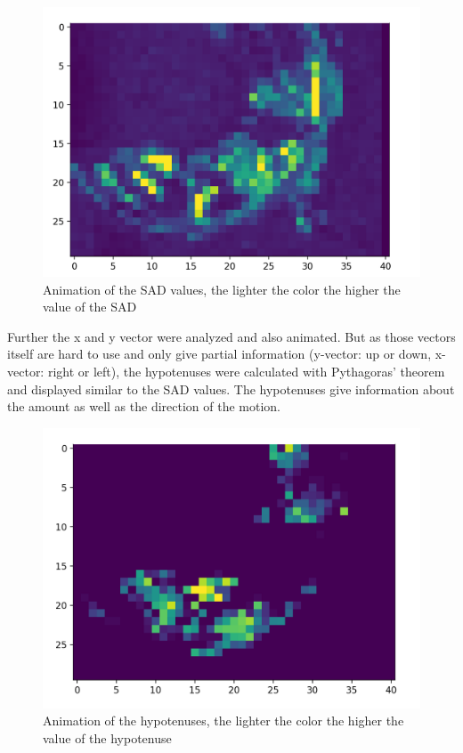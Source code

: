 \documentclass[12pt, a4paper]{report}
\begin{document}
    \noindent
    \begin{figure}[H]
    \centering
    \includegraphics[scale=0.6]{Images/animation_sad.png}
    
    \caption{Animation of the SAD values, the lighter the color the higher the value of the SAD}
    \end{figure}
     
    Further the x and y vector were analyzed and also animated. But as those vectors itself are hard to use and only give partial information (y-vector: up or down, x-vector: right or left), the hypotenuses were calculated with Pythagoras' theorem and displayed similar to the SAD values. The hypotenuses give information about the amount as well as the direction of the motion.
    
    \noindent
    \begin{figure}[H]
    \centering
    \includegraphics[scale=0.6]{Images/animation_hypotenuse.png}
    
    \caption{Animation of the hypotenuses, the lighter the color the higher the value of the hypotenuse}
    \end{figure}
    
\end{document}
